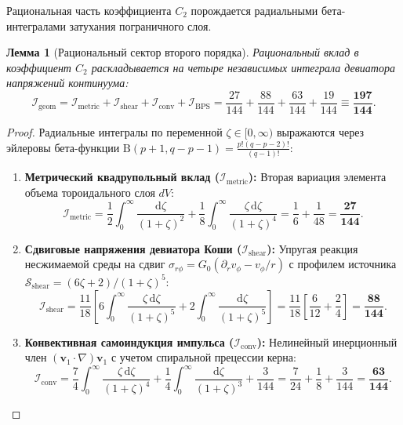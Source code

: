 \documentclass[11pt,a4paper]{article}
\newtheorem{lemma}[theorem]{Лемма}
\theoremstyle{definition}
\theoremstyle{remark}
\begin{document}
Рациональная часть коэффициента $C_2$ порождается радиальными бета-интегралами затухания пограничного слоя.

\begin{lemma}[Рациональный сектор второго порядка]
Рациональный вклад в коэффициент $C_2$ раскладывается на четыре независимых интеграла девиатора напряжений континуума:
\begin{equation}
    \mathcal{I}_{\mathrm{geom}} = \mathcal{I}_{\mathrm{metric}} + \mathcal{I}_{\mathrm{shear}} + \mathcal{I}_{\mathrm{conv}} + \mathcal{I}_{\mathrm{BPS}} = \frac{27}{144} + \frac{88}{144} + \frac{63}{144} + \frac{19}{144} \equiv \boldsymbol{\frac{197}{144}}.
    \label{eq:197_144_decomposition}
\end{equation}
\end{lemma}

\begin{proof}
Радиальные интегралы по переменной $\zeta \in [0, \infty)$ выражаются через эйлеровы бета-функции $\mathrm{B}(p+1, q-p-1) = \frac{p!(q-p-2)!}{(q-1)!}$:
\begin{enumerate}
    \item \textbf{Метрический квадрупольный вклад ($\mathcal{I}_{\mathrm{metric}}$):} Вторая вариация элемента объема тороидального слоя $dV$:
    \begin{equation}
        \mathcal{I}_{\mathrm{metric}} = \frac{1}{2}\int_0^\infty \frac{\mathrm{d}\zeta}{(1+\zeta)^2} + \frac{1}{8}\int_0^\infty \frac{\zeta \, \mathrm{d}\zeta}{(1+\zeta)^4} = \frac{1}{6} + \frac{1}{48} = \boldsymbol{\frac{27}{144}}.
    \end{equation}
    
    \item \textbf{Сдвиговые напряжения девиатора Коши ($\mathcal{I}_{\mathrm{shear}}$):} Упругая реакция несжимаемой среды на сдвиг $\sigma_{r\phi} = G_0 (\partial_r v_\phi - v_\phi/r)$ с профилем источника $\mathcal{S}_{\mathrm{shear}} = (6\zeta + 2)/(1+\zeta)^5$:
    \begin{equation}
        \mathcal{I}_{\mathrm{shear}} = \frac{11}{18} \left[ 6 \int_0^\infty \frac{\zeta \, \mathrm{d}\zeta}{(1+\zeta)^5} + 2 \int_0^\infty \frac{\mathrm{d}\zeta}{(1+\zeta)^5} \right] = \frac{11}{18} \left[ \frac{6}{12} + \frac{2}{4} \right] = \boldsymbol{\frac{88}{144}}.
    \end{equation}
    
    \item \textbf{Конвективная самоиндукция импульса ($\mathcal{I}_{\mathrm{conv}}$):} Нелинейный инерционный член $(\mathbf{v}_1 \cdot \nabla)\mathbf{v}_1$ с учетом спиральной прецессии керна:
    \begin{equation}
        \mathcal{I}_{\mathrm{conv}} = \frac{7}{4}\int_0^\infty \frac{\zeta \, \mathrm{d}\zeta}{(1+\zeta)^4} + \frac{1}{4}\int_0^\infty \frac{\mathrm{d}\zeta}{(1+\zeta)^3} + \frac{3}{144} = \frac{7}{24} + \frac{1}{8} + \frac{3}{144} = \boldsymbol{\frac{63}{144}}.
    \end{equation}
    

\end{enumerate}
\end{proof}
\end{document}
